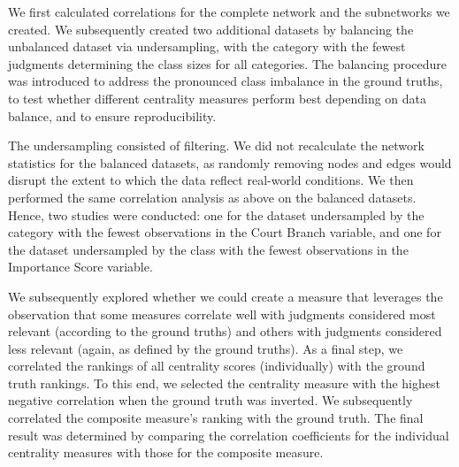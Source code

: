 \documentclass[sigconf,authordraft]{acmart}
\begin{document}
\begin{table}[t] %
\centering
\renewcommand{\arraystretch}{1.2} %
\caption{Importance Score frequencies before and after November 1, 1998.}
\label{tab:score-1998}
\end{table}


We first calculated correlations for the complete network and the subnetworks we created. We subsequently created two additional datasets by balancing the unbalanced dataset via undersampling, with the category with the fewest judgments determining the class sizes for all categories.
The balancing procedure was introduced to address the pronounced class imbalance in the ground truths, to test whether different centrality measures perform best depending on data balance, and to ensure reproducibility.

The undersampling consisted of filtering. We did not recalculate the network statistics for the balanced datasets, as randomly removing nodes and edges would disrupt the extent to which the data reflect real-world conditions. We then performed the same correlation analysis as above on the balanced datasets. Hence, two studies were conducted: one for the dataset undersampled by the category with the fewest observations in the Court Branch variable, and one for the dataset undersampled by the class with the fewest observations in the Importance Score variable.

We subsequently explored whether we could create a measure that leverages the observation that some measures correlate well with judgments considered most relevant (according to the ground truths) and others with judgments considered less relevant (again, as defined by the ground truths).
As a final step, we correlated the rankings of all centrality scores (individually) with the ground truth rankings. To this end, we selected the centrality measure with the highest negative correlation when the ground truth was inverted. We subsequently correlated the composite measure's ranking with the ground truth. The final result was determined by comparing the correlation coefficients for the individual centrality measures with those for the composite measure.
\end{document}

